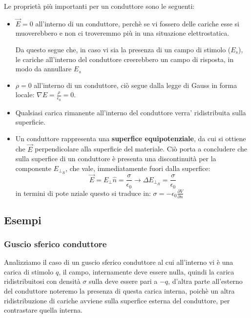\documentclass{book}
\begin{document}
Le proprietà più importanti per un conduttore sono le seguenti:
\begin{itemize}
  \item $\vec{E}=0$ all'interno di un conduttore, perchè se vi fossero delle cariche esse si muoverebbero e non ci troveremmo più in una situazione elettrostatica.
  
  Da questo segue che, in caso vi sia la presenza di un campo di stimolo ($E_s$), le cariche all'interno del conduttore creerebbero un campo di risposta, in modo da 
  annullare $E_s$
  \item $\rho=0$ all'interno di un conduttore, ciò segue dalla legge di Gauss in forma locale: $\nabla E = \frac{\rho}{\epsilon_0}=0$.
  \item Qualsiasi carica rimanente all'interno del conduttore verra' ridistribuita sulla superficie.
  \item Un conduttore rappresenta una \textbf{superfice equipotenziale}, da cui si ottiene che $\vec{E}$ perpendicolare alla superficie del materiale.
  Ciò porta a concludere che sulla superfice di un conduttore è presenta una discontinuità per la componente $E_{\perp_R}$, che vale, immediatamente fuori dalla superfice:
  \[
  \vec{E}= E_{\perp}\hat{n}=\frac{\sigma}{\epsilon_0} \rightarrow \Delta E_{\perp_R} = \frac{\sigma}{\epsilon_0}
  \]
  in termini di pote nziale questo si traduce in: $\sigma = -\epsilon_0 \frac{\partial V}{\partial n}$
\end{itemize}

\subsection{Esempi}
\subsubsection{Guscio sferico conduttore}
Analizziamo il caso di un guscio sferico conduttore al cui all'interno vi è una carica di stimolo $q$, il campo, internamente deve essere nulla, quindi
la carica ridistribuitosi con densità $\sigma$ sulla deve essere pari a $-q$, d'altra parte all'esterno del conduttore noteremo la presenza di questa carica interna,
poichè un altra ridistribuzione di cariche avviene sulla superfice esterna del conduttore, per contrastare quella interna. 

\begin{center}
\end{center}
\end{document}
